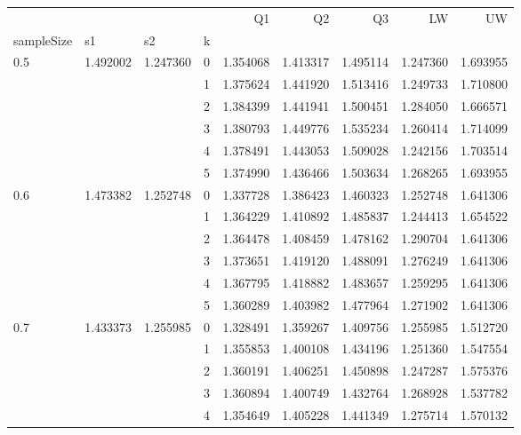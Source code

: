 \begin{tabular}{llllrrrrr}
\toprule
    &          &          &   &        Q1 &        Q2 &        Q3 &        LW &        UW \\
sampleSize & s1 & s2 & k &           &           &           &           &           \\
\midrule
0.5 & 1.492002 & 1.247360 & 0 &  1.354068 &  1.413317 &  1.495114 &  1.247360 &  1.693955 \\
    &          &          & 1 &  1.375624 &  1.441920 &  1.513416 &  1.249733 &  1.710800 \\
    &          &          & 2 &  1.384399 &  1.441941 &  1.500451 &  1.284050 &  1.666571 \\
    &          &          & 3 &  1.380793 &  1.449776 &  1.535234 &  1.260414 &  1.714099 \\
    &          &          & 4 &  1.378491 &  1.443053 &  1.509028 &  1.242156 &  1.703514 \\
    &          &          & 5 &  1.374990 &  1.436466 &  1.503634 &  1.268265 &  1.693955 \\
0.6 & 1.473382 & 1.252748 & 0 &  1.337728 &  1.386423 &  1.460323 &  1.252748 &  1.641306 \\
    &          &          & 1 &  1.364229 &  1.410892 &  1.485837 &  1.244413 &  1.654522 \\
    &          &          & 2 &  1.364478 &  1.408459 &  1.478162 &  1.290704 &  1.641306 \\
    &          &          & 3 &  1.373651 &  1.419120 &  1.488091 &  1.276249 &  1.641306 \\
    &          &          & 4 &  1.367795 &  1.418882 &  1.483657 &  1.259295 &  1.641306 \\
    &          &          & 5 &  1.360289 &  1.403982 &  1.477964 &  1.271902 &  1.641306 \\
0.7 & 1.433373 & 1.255985 & 0 &  1.328491 &  1.359267 &  1.409756 &  1.255985 &  1.512720 \\
    &          &          & 1 &  1.355853 &  1.400108 &  1.434196 &  1.251360 &  1.547554 \\
    &          &          & 2 &  1.360191 &  1.406251 &  1.450898 &  1.247287 &  1.575376 \\
    &          &          & 3 &  1.360894 &  1.400749 &  1.432764 &  1.268928 &  1.537782 \\
    &          &          & 4 &  1.354649 &  1.405228 &  1.441349 &  1.275714 &  1.570132 \\

\end{tabular}
